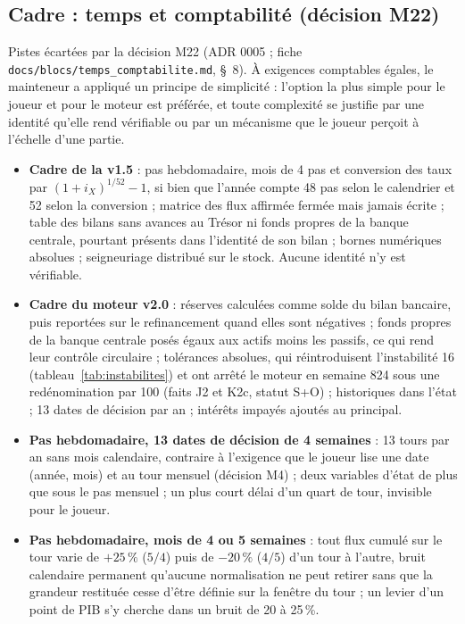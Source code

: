 \documentclass[11pt,a4paper]{article}
\begin{document}
\subsection*{Cadre : temps et comptabilité (décision M22)}
Pistes écartées par la décision M22 (ADR 0005 ; fiche \nolinkurl{docs/blocs/temps_comptabilite.md}, \S~8). À exigences comptables égales, le mainteneur a appliqué un principe de simplicité : l'option la plus simple pour le joueur et pour le moteur est préférée, et toute complexité se justifie par une identité qu'elle rend vérifiable ou par un mécanisme que le joueur perçoit à l'échelle d'une partie.
\begin{itemize}
\item \textbf{Cadre de la v1.5} : pas hebdomadaire, mois de 4 pas et conversion des taux par $(1+i_X)^{1/52} - 1$, si bien que l'année compte 48 pas selon le calendrier et 52 selon la conversion ; matrice des flux affirmée fermée mais jamais écrite ; table des bilans sans avances au Trésor ni fonds propres de la banque centrale, pourtant présents dans l'identité de son bilan ; bornes numériques absolues ; seigneuriage distribué sur le stock. Aucune identité n'y est vérifiable.
\item \textbf{Cadre du moteur v2.0} : réserves calculées comme solde du bilan bancaire, puis reportées sur le refinancement quand elles sont négatives ; fonds propres de la banque centrale posés égaux aux actifs moins les passifs, ce qui rend leur contrôle circulaire ; tolérances absolues, qui réintroduisent l'instabilité 16 (tableau~\ref{tab:instabilites}) et ont arrêté le moteur en semaine 824 sous une redénomination par 100 (faits J2 et K2c, statut S+O) ; historiques dans l'état ; 13 dates de décision par an ; intérêts impayés ajoutés au principal.
\item \textbf{Pas hebdomadaire, 13 dates de décision de 4 semaines} : 13 tours par an sans mois calendaire, contraire à l'exigence que le joueur lise une date (année, mois) et au tour mensuel (décision M4) ; deux variables d'état de plus que sous le pas mensuel ; un plus court délai d'un quart de tour, invisible pour le joueur.
\item \textbf{Pas hebdomadaire, mois de 4 ou 5 semaines} : tout flux cumulé sur le tour varie de $+25\,\%$ ($5/4$) puis de $-20\,\%$ ($4/5$) d'un tour à l'autre, bruit calendaire permanent qu'aucune normalisation ne peut retirer sans que la grandeur restituée cesse d'être définie sur la fenêtre du tour ; un levier d'un point de PIB s'y cherche dans un bruit de 20 à 25\,\%.

\end{itemize}
\end{document}
